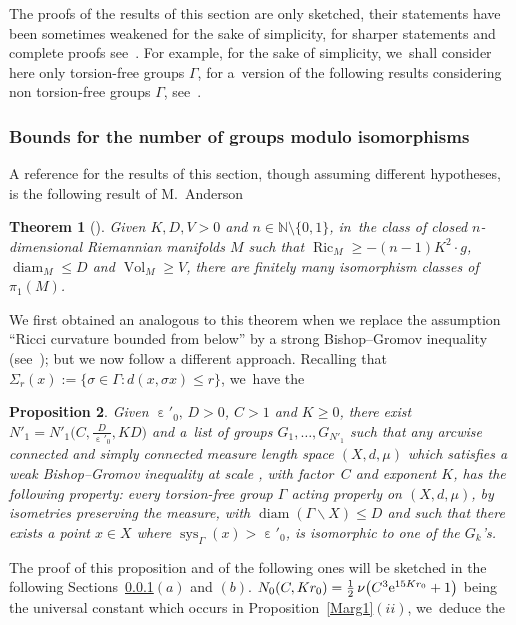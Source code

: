 \documentclass[pdftex]{sigma}
\numberwithin{equation}{section}
\newtheorem{theor}{Theorem}[section]
\newtheorem{prop}[theor]{Proposition}
\newcommand{\N}{\mathbb{N}}
\newcommand{\Vol}{\operatorname{Vol}}
\newcommand{\Ric}{\operatorname{Ric}}
\newcommand{\sys}{\operatorname{sys}}
\newcommand{\diam}{\operatorname{diam}}
\newcommand{\e}{\operatorname{\varepsilon}}
\begin{document}
The proofs of the results of this section are only sketched, their statements have been sometimes weakened for the sake of simplicity, for sharper
statements and complete proofs see~\cite{BCGS2}. For example, for the sake of simplicity, we~shall consider here only torsion-free groups $\Gamma$, for a~version of the following results considering non torsion-free groups $\Gamma$, see~\cite{BCGS2}.

\subsubsection{Bounds for the number of groups modulo isomorphisms}\label{boundgenerators0}

A reference for the results of this section, though assuming different hypotheses, is the
following result of M.~Anderson

\begin{theor}[{\cite[Theorem~2.3]{An}}]%
Given $K, D, V > 0$ and
$n \in \N \setminus \{0,1\}$, in~the class of closed $n$-dimensional
Riemannian manifolds $M$ such that $\Ric_M \ge -(n-1) K^2\cdot g$, $\diam_M \le D$ and $\Vol_M \ge V$, there are finitely many isomorphism classes
of~$\pi_1 (M)$.
\end{theor}

We first obtained an analogous to this theorem when we replace the assumption ``Ricci curvature bounded from below'' by a strong Bishop--Gromov
inequality (see~\cite{BCGS2}); but we now follow a different approach.
Recalling that $\Sigma_{r} (x) := \{ \sigma \in \Gamma \colon d(x, \sigma x) \le r\}$, we~have the

\begin{prop}\label{majorgroupes1}
Given $\e'_0, \,D >0$, $C > 1 $ and $K\ge 0$, there exist
$N'_1 = N'_1 \big(C, \frac{D}{\e'_0}, K D \big)$ and a~list of groups $G_1,\dots, G_{N'_1}$
such that any arcwise connected and simply connected measure length space
$(X,d,\mu)$ which satisfies a weak Bishop--Gromov inequality at scale
\smash{$\frac{\e'_0}{2}$}, with factor~$C$ and exponent $K$, has the following property: every torsion-free group $\Gamma$ acting properly on $(X,d,\mu)$,
by isometries
preserving the measure, with $\diam (\Gamma \backslash X) \le D$ and such
that there exists a point $x \in X$ where $\sys_\Gamma (x) > \e'_0$, is isomorphic
to one of the $G_k$'s.
\end{prop}

The proof of this proposition and of the following ones will be sketched in the following Sections~\ref{boundgenerators0}$(a)$ and $(b)$.
$N_0 (C, Kr_0)= \frac{1}{2} \,\nu \big(C^3 {\rm e}^{15 K r_0} + 1\big)$ being the universal constant which occurs in Proposition~\ref{Marg1}$(ii)$, we~deduce the
\end{document}
